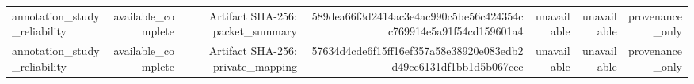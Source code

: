 \begin{table}[t]
\begin{tabular}{lrrrrrr}
annotation\_study\_reliability & available\_complete & Artifact SHA-256: packet\_summary & 589dea66f3d2414ac3e4ac990c5be56c424354cc769914e5a91f54cd159601a4 & unavailable & unavailable & provenance\_only \\
annotation\_study\_reliability & available\_complete & Artifact SHA-256: private\_mapping & 57634d4cde6f15ff16ef357a58e38920e083edb2d49ce6131df1bb1d5b067cec & unavailable & unavailable & provenance\_only \\
\bottomrule
\end{tabular}
\end{table}
